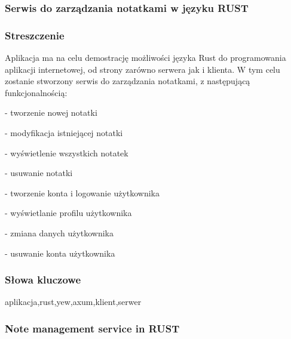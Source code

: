 \documentclass[a4paper,twoside,12pt]{book}
\begin{document}


\cleardoublepage

\rmfamily\normalfont
\pagestyle{empty}



\subsubsection*{Serwis do zarządzania notatkami w języku RUST} 
\Title

\subsubsection*{Streszczenie}  
Aplikacja  ma  na  celu  demostrację  możliwości  języka  Rust  do  programowania  aplikacji
internetowej, od strony zarówno serwera jak i klienta. W tym celu zostanie stworzony serwis do zarządzania
notatkami, z następującą funkcjonalnością:   

- tworzenie nowej notatki

- modyfikacja istniejącej notatki

- wyświetlenie wszystkich notatek

- usuwanie notatki

- tworzenie konta i logowanie użytkownika

- wyświetlanie profilu użytkownika

- zmiana danych użytkownika

- usuwanie konta użytkownika


\subsubsection*{Słowa kluczowe} 
aplikacja,rust,yew,axum,klient,serwer

\subsubsection*{Note management service in RUST} 
\begin{otherlanguage}{british}
\TitleAlt
\end{otherlanguage}
\end{document}

